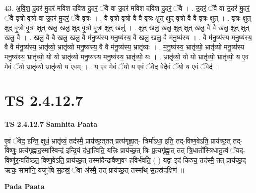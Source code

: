 \documentclass[17pt]{extarticle}
\begin{document}
43. अ॒वि॒श॒ दु॒दर॑ मु॒दर॑ मविश दविश दु॒दरं॒ ॅवै वा उ॒दर॑ मविश दविश दु॒दरं॒ ॅवै । . उ॒दरं॒ ॅवै वा उ॒दर॑ मु॒दरं॒ ॅवै वृ॒त्रो वृ॒त्रो वा उ॒दर॑ मु॒दरं॒ ॅवै वृ॒त्रः । . वै वृ॒त्रो वृ॒त्रो वै वै वृ॒त्रः क्षुत् क्षुद् वृ॒त्रो वै वै वृ॒त्रः क्षुत् । . वृ॒त्रः क्षुत् क्षुद् वृ॒त्रो वृ॒त्रः क्षुत् खलु॒ खलु॒ क्षुद् वृ॒त्रो वृ॒त्रः क्षुत् खलु॑ । . क्षुत् खलु॒ खलु॒ क्षुत् क्षुत् खलु॒ वै वै खलु॒ क्षुत् क्षुत् खलु॒ वै । . खलु॒ वै वै खलु॒ खलु॒ वै म॑नु॒ष्य॑स्य मनु॒ष्य॑स्य॒ वै खलु॒ खलु॒ वै म॑नु॒ष्य॑स्य । . वै म॑नु॒ष्य॑स्य मनु॒ष्य॑स्य॒ वै वै म॑नु॒ष्य॑स्य॒ भ्रातृ॑व्यो॒ भ्रातृ॑व्यो मनु॒ष्य॑स्य॒ वै वै म॑नु॒ष्य॑स्य॒ भ्रातृ॑व्यः । . म॒नु॒ष्य॑स्य॒ भ्रातृ॑व्यो॒ भ्रातृ॑व्यो मनु॒ष्य॑स्य मनु॒ष्य॑स्य॒ भ्रातृ॑व्यो॒ यो यो भ्रातृ॑व्यो मनु॒ष्य॑स्य मनु॒ष्य॑स्य॒ भ्रातृ॑व्यो॒ यः । . भ्रातृ॑व्यो॒ यो यो भ्रातृ॑व्यो॒ भ्रातृ॑व्यो॒ य ए॒व मे॒वं ॅयो भ्रातृ॑व्यो॒ भ्रातृ॑व्यो॒ य ए॒वम् । . य ए॒व मे॒वं ॅयो य ए॒वं ॅवेद॒ वेदै॒वं ॅयो य ए॒वं ॅवेद॑ । \newline
\pagebreak
{}
\section*{ TS 2.4.12.7 }

\textbf{TS 2.4.12.7 } \newline
\textbf{Samhita Paata} \newline

ए॒वं ॅवेद॒ हन्ति॒ क्षुधं॒ भ्रातृ॑व्यं॒ तद॑स्मै॒ प्राय॑च्छ॒त्‌तत् प्रत्य॑गृह्णा॒त्-  त्रिर्मा॑ऽधा॒ इति॒ तद्-विष्ण॒वेऽति॒ प्राय॑च्छ॒त् तद्-विष्णुः॒ प्रत्य॑गृह्णाद॒स्मास्विन्द्र॑ इन्द्रि॒यं द॑धा॒त्विति॒ यत्त्रिः प्राय॑च्छ॒त् त्रिः प्र॒त्यगृ॑ह्णा॒त् तत् त्रि॒धातो᳚स्त्रिधातु॒त्वं ॅयद्-विष्णु॑र॒न्वति॑ष्ठत॒ विष्ण॒वेऽति॒ प्राय॑च्छ॒त् तस्मा॑दैन्द्रावैष्ण॒वꣳ ह॒विर्भ॑वति॒ ( ) यद्वा इ॒दं किञ्च॒ तद॑स्मै॒ तत् प्राय॑च्छ॒द् ऋचः॒ सामा॑नि॒ यजूꣳ॑षि स॒हस्रं॒ ॅवा अ॑स्मै॒ तत् प्राय॑च्छ॒त् तस्मा᳚थ् स॒हस्र॑दक्षिणं ॥ \newline

\textbf{Pada Paata} \newline
\end{document}
